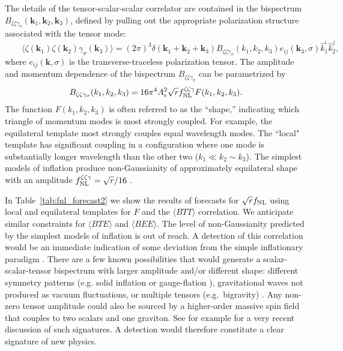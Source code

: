 The details of the tensor-scalar-scalar correlator are contained in the bispectrum $B_{\zeta\zeta\gamma_\sigma}(\mathbf{k}_1,\mathbf{k}_2,\mathbf{k}_3)$, defined by pulling out the appropriate polarization structure associated with the tensor mode:
\begin{equation}
\label{eq:Bsst}
\qquad \langle \zeta(\mathbf{k}_1)\zeta(\mathbf{k}_2)\gamma_\sigma(\mathbf{k}_3) \rangle = (2\pi)^3 \delta(\mathbf{k}_1+\mathbf{k}_2+\mathbf{k}_3) B_{\zeta\zeta\gamma_\sigma}(k_1,k_2,k_3) e_{ij}(\mathbf{k}_3,\sigma)\hat{k}_1^i \hat{k}_2^j,
\end{equation}
where $e_{ij}(\mathbf{k},\sigma)$ is the transverse-traceless polarization tensor. The amplitude and momentum dependence of the bispectrum $B_{\zeta\zeta\gamma_\sigma}$ can be parametrized by \cite{Meerburg:2016ecv}
\begin{equation}
\label{eq:Bzzg}
B_{\zeta\zeta\gamma_\sigma}(k_1,k_2,k_3)= 16 \pi^4 A_{\rm s}^2 \sqrt{r}f_\mathrm{NL}^{\zeta\zeta\gamma} F(k_1,k_2,k_3).
\end{equation} 
The function $F(k_1,k_2,k_3)$ is often referred to as the ``shape,'' indicating which triangle of momentum modes is most strongly coupled.  For example, the equilateral template most strongly couples equal wavelength modes. The ``local" template has significant coupling in a configuration where one mode is substantially longer wavelength than the other two ($k_1\ll k_2\sim k_3$). The simplest models of inflation produce non-Gaussianity of approximately equilateral shape with an amplitude $f^{\zeta \zeta\gamma }_{\rm NL} = \sqrt{r}/16$ \cite{Maldacena:2002vr,Maldacena:2011nz}. 

In Table~\ref{tab:fnl_forecast2} we show the results of forecasts for $\sqrt{r}f_{\rm NL}$ using local and equilateral templates for $F$ and the $\langle BTT\rangle$ correlation. We anticipate similar constraints for $\langle BTE\rangle $ and $\langle BEE\rangle$. The level of non-Gaussianity predicted by the simplest models of inflation is out of reach. A detection of this correlation would be an immediate indication of some deviation from the simple inflationary paradigm \cite{Bordin:2016ruc,Dimastrogiovanni:2015pla}. There are a few known possibilities that would generate a scalar-scalar-tensor bispectrum with larger amplitude and/or different shape: different symmetry patterns (e.g. solid inflation \cite{Endlich:2012pz} or gauge-flation \cite{Maleknejad:2011jw, Adshead:2016iix}), gravitational waves not produced as vacuum fluctuations, or multiple tensors (e.g.\ bigravity) \cite{Bordin:2016ruc}. Any non-zero tensor amplitude could also be sourced by a higher-order massive spin field that couples to two scalars and one graviton. See for example \cite{Hayden:2016xxa} for a very recent discussion of such signatures. A detection would therefore constitute a clear signature of new physics. 

